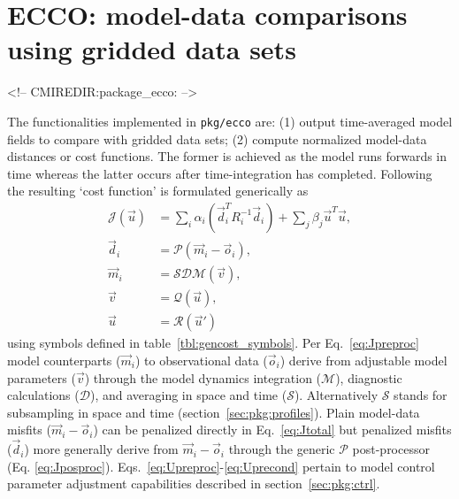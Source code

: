 \section{ECCO: model-data comparisons using gridded data sets}
\label{sec:pkg:ecco}
\begin{rawhtml}
<!-- CMIREDIR:package_ecco: -->
\end{rawhtml}

\def\mitgcmCheckpointVersion{65x}

The functionalities implemented in \texttt{pkg/ecco} are: (1) output time-averaged model fields to compare with gridded data sets; (2) compute normalized model-data distances or cost functions. The former is achieved as the model runs forwards in time whereas the latter occurs after time-integration has completed. Following \cite{for-eta:15} the resulting `cost function' is formulated generically as
\begin{align} 
	\mathcal{J}(\vec{u}) &= \sum_i \alpha_i \left(\vec{d}_i^T R_i^{-1} \vec{d}_i\right) + \sum_j \beta_j \vec{u}^T\vec{u}, \label{eq:Jtotal} \\
	\vec{d}_i &= \mathcal{P}(\vec{m}_i - \vec{o}_i), \label{eq:Jposproc} \\
	\vec{m}_i &= \mathcal{S}\mathcal{D}\mathcal{M}(\vec{v}), \label{eq:Jpreproc} \\
	\vec{v}	  &= \mathcal{Q}(\vec{u}), \label{eq:Upreproc} \\
	\vec{u}	  &= \mathcal{R}(\vec{u}') \label{eq:Uprecond}
\end{align}
using symbols defined in table~\ref{tbl:gencost_symbols}. Per Eq.~\eqref{eq:Jpreproc} model counterparts ($\vec{m}_i$) to observational data ($\vec{o}_i$) derive from adjustable model parameters ($\vec{v}$) through the model dynamics integration ($\mathcal{M}$), diagnostic calculations ($\mathcal{D}$), and averaging in space and time ($\mathcal{S}$). Alternatively $\mathcal{S}$ stands for subsampling in space and time (section~\ref{sec:pkg:profiles}). Plain model-data misfits ($\vec{m}_i-\vec{o}_i$) can be penalized directly in Eq.~\eqref{eq:Jtotal} but penalized misfits ($\vec{d}_i$) more generally derive from $\vec{m}_i-\vec{o}_i$ through the generic $\mathcal{P}$ post-processor (Eq. \eqref{eq:Jposproc}). Eqs.~\eqref{eq:Upreproc}-\eqref{eq:Uprecond} pertain to model control parameter adjustment capabilities described in section~\ref{sec:pkg:ctrl}.

